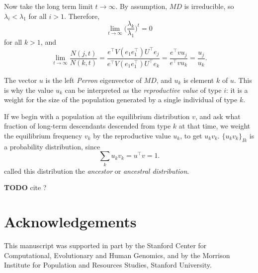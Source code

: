 \documentclass[9pt, a4paper, twocolumn]{extarticle}   	%
\newcommand*{\tr}{^\intercal}
\newcommand{\goesto}{\rightarrow}
\begin{document}
Now take the long term limit $t \goesto \infty$.
By assumption, $MD$ is irreducible, so $\lambda_i < \lambda_1$ for all $i > 1$.
Therefore,
\begin{equation}
\lim_{t \goesto \infty} \Big( \frac{\lambda_k}{\lambda_1} \Big)^t = 0
\end{equation}
for all $k > 1$, and
\begin{equation}
\lim_{t \goesto \infty}\frac{N(j,t)}{N(k,t)} =
\frac{e\tr V (e_1 e_1\tr) U\tr e_j} { e\tr V (e_1 e_1\tr) U\tr e_k} = 
\frac{ e\tr v u_j} { e\tr v  u_k} =
\frac{u_j} {u_k}.
\end{equation}

The vector $u$ is the left \emph{Perron} eigenvector of $MD$, and $u_k$ is element $k$ of $u$.
This is why the value $u_k$ can be interpreted as the \emph{reproductive value} of type $i$: it is a weight for the size of the population generated by a single individual of type $k$.

If we begin with a population at the equilibrium distribution $v$,
and ask what fraction of long-term descendants descended from type $k$ at that time,
we weight the equilibrium frequency $v_k$ by the reproductive value $u_k$, to get $u_k v_k$.
$\{u_k v_k\}_{Ik}$ is a probability distribution, since
\begin{equation}
\sum_k {u_k v_k} = u\tr v = 1.
\end{equation}
\citet{Hermisson2002} called this distribution the \emph{ancestor} or \emph{ancestral distribution}.

\textbf{TODO} cite \citep{Grafen2006}?

{\small
\section*{Acknowledgements}

This manuscript was supported in part by the Stanford Center for Computational, Evolutionary and Human Genomics, and by the Morrison Institute for Population and Resources Studies, Stanford University.
}



\end{document}
